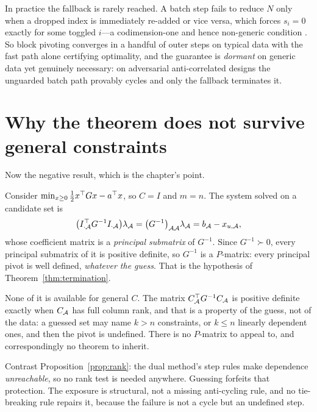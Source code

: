 In practice the fallback is rarely reached. A batch step fails to reduce $N$ only
when a dropped index is immediately re-added or vice versa, which forces $s_i = 0$
exactly for some toggled $i$---a codimension-one and hence non-generic condition
\cite{judice1994}. So block pivoting converges in a handful of outer steps on
typical data with the fast path alone certifying optimality, and the guarantee is
\emph{dormant} on generic data yet genuinely necessary: on adversarial
anti-correlated designs the unguarded batch path provably cycles and only the
fallback terminates it.

\section{Why the theorem does not survive general constraints}
\label{sec:no-theorem}

Now the negative result, which is the chapter's point.

Consider $\min_{x\ge0}\tfrac12 x^{\top} G x - a^{\top} x$, so $C = I$ and $m = n$. The system
solved on a candidate set is
\begin{equation}
  \bigl(I_{\cdot\mathcal{A}}^{\top} G^{-1} I_{\cdot\mathcal{A}}\bigr)\lambda_{\mathcal{A}}
  = \bigl(G^{-1}\bigr)_{\mathcal{A}\mathcal{A}}\lambda_{\mathcal{A}}
  = b_{\mathcal{A}} - x_{u,\mathcal{A}},
  \label{eq:principal}
\end{equation}
whose coefficient matrix is a \emph{principal submatrix} of $G^{-1}$. Since
$G^{-1} \succ 0$, every principal submatrix of it is positive definite, so $G^{-1}$
is a $P$-matrix: every principal pivot is well defined, \emph{whatever the guess}.
That is the hypothesis of Theorem~\ref{thm:termination}.

None of it is available for general $C$. The matrix $C_{\mathcal{A}}^{\top} G^{-1} C_{\mathcal{A}}$
is positive definite exactly when $C_{\mathcal{A}}$ has full column rank, and that is a
property of the guess, not of the data: a guessed set may name $k > n$ constraints,
or $k \le n$ linearly dependent ones, and then the pivot is undefined. There is no
$P$-matrix to appeal to, and correspondingly no theorem to inherit.

Contrast Proposition~\ref{prop:rank}: the dual method's step rules make dependence
\emph{unreachable}, so no rank test is needed anywhere. Guessing forfeits that
protection. The exposure is structural, not a missing anti-cycling rule, and no
tie-breaking rule repairs it, because the failure is not a cycle but an undefined
step.

